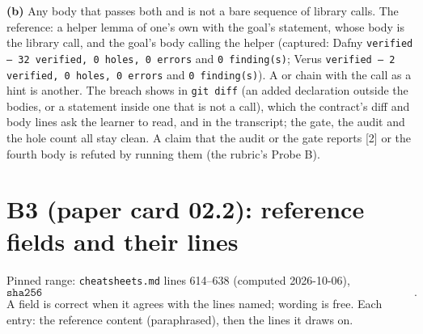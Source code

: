 \documentclass[11pt]{article}
\begin{document}
\textbf{(b)} Any body that passes both and is not a bare sequence of library
calls. The reference: a helper lemma of one's own with the goal's statement,
whose body is the library call, and the goal's body calling the helper
(captured: Dafny \texttt{verified --- 32 verified, 0 holes, 0 errors} and
\texttt{0 finding(s)}; Verus \texttt{verified --- 2 verified, 0 holes, 0
errors} and \texttt{0 finding(s)}). A  or  chain with the
call as a hint is another. The breach shows in \texttt{git diff} (an added
declaration outside the bodies, or a statement inside one that is not a
call), which the contract's diff and body lines ask the learner to read, and
in the transcript; the gate, the audit and the hole count all stay clean.
A claim that the audit or the gate reports [2] or the fourth body is refuted
by running them (the rubric's Probe B).

\section*{B3 (paper card 02.2): reference fields and their lines}

Pinned range: \texttt{cheatsheets.md} lines 614--638 (computed 2026-10-06),
\[ \texttt{sha256 5a0ff58db586d31eb8bde23fb09f5e1c8f4d2a558b339bf970050c8aba407e6a}. \]
A field is correct when it agrees with the lines named; wording is free. Each
entry: the reference content (paraphrased), then the lines it draws on.
\end{document}
